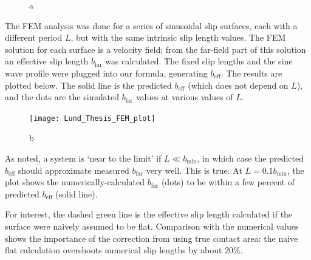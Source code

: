 \documentclass[12pt, a4paper, twoside, openright]{book}
\newcommand{\beff}{\ensuremath{b_{\mathrm{eff}}}}
\newcommand{\bmin}{\ensuremath{b_{\mathrm{min}}}}
\newcommand{\bfar}{\ensuremath{b_{\mathrm{far}}}}
\begin{document}
\begin{figure}[ht]
\centering
{}
\caption{a}\label{a}
\end{figure}


The FEM analysis was done for a series of sinusoidal slip surfaces, each with a different period $L$, but with the same intrinsic slip length values.  The FEM solution for each surface is a velocity field; from the far-field part of this solution an effective slip length $\bfar$ was calculated.  The fixed slip lengths and the sine wave profile were plugged into our formula, generating $\beff$.  The results are plotted below.  The solid line is the predicted $\beff$ (which does not depend on $L$), and the dots are the simulated $\bfar$ values at various values of $L$.


\begin{figure}[ht]
\texttt{[image: Lund\_Thesis\_FEM\_plot]}
\caption{b}\label{b}
\end{figure}


As noted, a system is `near to the limit' if $L \ll \bmin$, in which case the predicted $\beff$ should approximate measured $\bfar$ very well.  This is true.  At $L = 0.1 \bmin$, the plot shows the numerically-calculated $\bfar$ (dots) to be within a few percent of predicted $\beff$ (solid line).

For interest,
the dashed green line is the effective slip length calculated if the surface were naively assumed to be flat.  Comparison with the numerical values shows the importance of the correction from using true contact area: the naive flat calculation overshoots numerical slip lengths by about 20\%.
\end{document}
